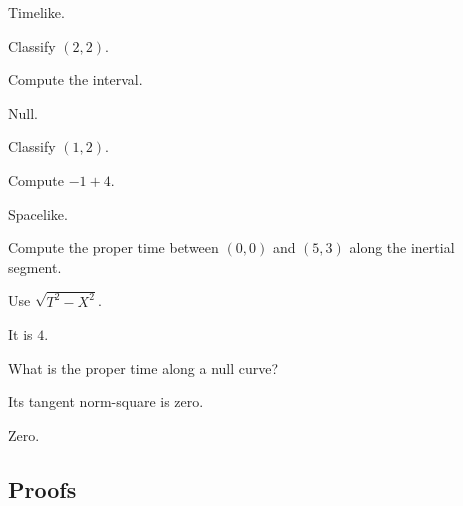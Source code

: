\begin{solution}
Timelike.
\end{solution}

\begin{exercise}\label{exr:vii30-ped-02}
Classify \((2,2)\).
\end{exercise}

\begin{hint}
Compute the interval.
\end{hint}

\begin{solution}
Null.
\end{solution}

\begin{exercise}\label{exr:vii30-ped-03}
Classify \((1,2)\).
\end{exercise}

\begin{hint}
Compute \(-1+4\).
\end{hint}

\begin{solution}
Spacelike.
\end{solution}

\begin{exercise}\label{exr:vii30-ped-04}
Compute the proper time between \((0,0)\) and \((5,3)\) along the inertial segment.
\end{exercise}

\begin{hint}
Use \(\sqrt{T^2-X^2}\).
\end{hint}

\begin{solution}
It is \(4\).
\end{solution}

\begin{exercise}\label{exr:vii30-ped-05}
What is the proper time along a null curve?
\end{exercise}

\begin{hint}
Its tangent norm-square is zero.
\end{hint}

\begin{solution}
Zero.
\end{solution}

\subsection*{Proofs}

